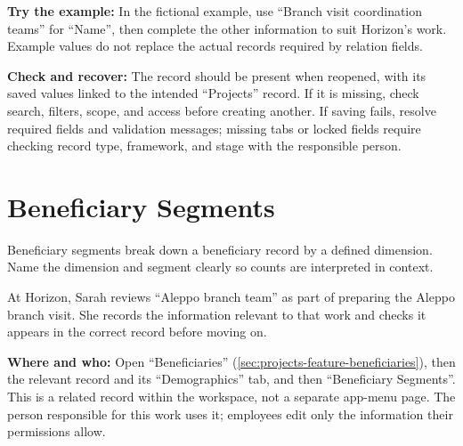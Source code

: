\textbf{Try the example:} In the fictional example, use “Branch visit coordination teams” for “Name”, then complete the other information to suit Horizon's work. Example values do not replace the actual records required by relation fields.

\textbf{Check and recover:} The record should be present when reopened, with its saved values linked to the intended “Projects” record. If it is missing, check search, filters, scope, and access before creating another. If saving fails, resolve required fields and validation messages; missing tabs or locked fields require checking record type, framework, and stage with the responsible person.

\clearpage
\section{Beneficiary Segments}
\label{sec:projects-feature-beneficiary-segments}

Beneficiary segments break down a beneficiary record by a defined dimension. Name the dimension and segment clearly so counts are interpreted in context.

\begin{rcnote}
At Horizon, Sarah reviews “Aleppo branch team” as part of preparing the Aleppo branch visit. She records the information relevant to that work and checks it appears in the correct record before moving on.
\end{rcnote}

\textbf{Where and who:} Open “Beneficiaries” (\ref{sec:projects-feature-beneficiaries}), then the relevant record and its “Demographics” tab, and then “Beneficiary Segments”. This is a related record within the workspace, not a separate app-menu page. The person responsible for this work uses it; employees edit only the information their permissions allow.


